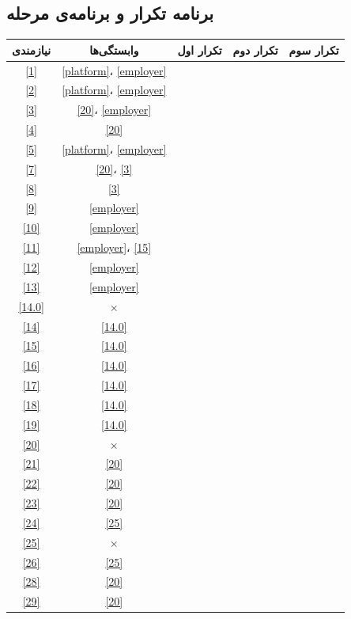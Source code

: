 \documentclass[12pt]{book}
\begin{document}
	\subsection{برنامه تکرار و برنامه‌ی مرحله}
	\begin{center}
		\begin{longtable}{|c|c|c|c|c|}
			\hline
			نیازمندی & وابستگی‌ها & تکرار اول & تکرار دوم & تکرار سوم \\
			\hline
			\hline
			\ref{1} & \ref{platform}، \ref{employer} & & & \\ \hline
			\ref{2} & \ref{platform}، \ref{employer} & \checkmark & & \\ \hline
			\ref{3} & \ref{20}، \ref{employer} & \checkmark & & \\ \hline
			\ref{4} & \ref{20} & \checkmark & & \\ \hline
			\ref{5} & \ref{platform}، \ref{employer} & \checkmark & & \\ \hline
			\ref{7} & \ref{20}، \ref{3} & & & \\ \hline
			\ref{8} & \ref{3} & \checkmark & & \\ \hline
			\ref{9} & \ref{employer} & \checkmark & & \\ \hline
			\ref{10} & \ref{employer} & \checkmark & & \\ \hline
			\ref{11} & \ref{employer}، \ref{15} & \checkmark & & \\ \hline
			\ref{12} & \ref{employer} & & & \\ \hline
			\ref{13} & \ref{employer} & \checkmark & & \\ \hline
			
			\ref{14.0} & $\times$ & \checkmark & & \\ \hline
			\ref{14} & \ref{14.0} & \checkmark & & \\ \hline
			\ref{15} & \ref{14.0} & \checkmark & & \\ \hline
			\ref{16} & \ref{14.0} & \checkmark & & \\ \hline
			\ref{17} & \ref{14.0} & \checkmark & & \\ \hline
			\ref{18} & \ref{14.0} & \checkmark & & \\ \hline
			\ref{19} & \ref{14.0} & \checkmark & & \\ \hline
			
			\ref{20} & $\times$ & \checkmark & & \\ \hline
			\ref{21} & \ref{20} & \checkmark & & \\ \hline
			\ref{22} & \ref{20} & \checkmark & & \\ \hline
			\ref{23} & \ref{20} & \checkmark & & \\ \hline
			\ref{24} & \ref{25} & \checkmark & & \\ \hline
			\ref{25} & $\times$ & \checkmark & & \\ \hline
			\ref{26} & \ref{25} & \checkmark & & \\ \hline
			\ref{28} & \ref{20} & \checkmark & & \\ \hline
			\ref{29} & \ref{20} & \checkmark & & \\ \hline
		\end{longtable}
	\end{center}
	
	
\end{document}
